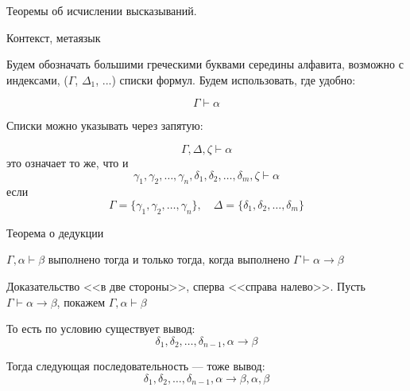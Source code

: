 \documentclass[aspectratio=169]{beamer}
\begin{document}
\newtheorem{axiom}{Аксиома}
\newtheorem{exmprus}{Пример}
\newtheorem{defrus}{Определение}
\newtheorem{lemmarus}{Лемма}
\newtheorem{thmrus}{Теорема}

\begin{frame}{}
\begin{center}\Large Теоремы об исчислении высказываний.\end{center}
\end{frame}

\begin{frame}{Контекст, метаязык}

Будем обозначать большими греческими буквами середины
алфавита, возможно с индексами, ($\Gamma$, $\Delta_1$, ...) списки формул.
Будем использовать, где удобно:

$$\Gamma \vdash \alpha$$\pause

Списки можно указывать через запятую:

$$\Gamma, \Delta, \zeta \vdash \alpha$$\pause
это означает то же, что и 
$$\gamma_1,\gamma_2,\dots,\gamma_n,\delta_1,\delta_2,\dots,\delta_m,\zeta\vdash\alpha$$
если 
$$\Gamma = \{\gamma_1,\gamma_2,\dots,\gamma_n\},\quad \Delta = \{\delta_1,\delta_2,\dots,\delta_m\}$$

\end{frame}

\begin{frame}{Теорема о дедукции}

\begin{theorem}
$\Gamma,\alpha\vdash\beta$ выполнено тогда и только тогда, когда выполнено $\Gamma\vdash\alpha\rightarrow\beta$
\end{theorem}\pause

\vspace{0.5cm}
Доказательство <<в две стороны>>, сперва <<справа налево>>.
Пусть $\Gamma\vdash\alpha\rightarrow\beta$, покажем $\Gamma,\alpha\vdash\beta$\pause\vspace{0.5cm}

То есть по условию существует вывод: $$\delta_1, \delta_2, \dots, \delta_{n-1}, \alpha\rightarrow\beta$$\pause

Тогда следующая последовательность --- тоже вывод: 
$$\delta_1, \delta_2, \dots, \delta_{n-1}, \alpha\rightarrow\beta, \alpha, \beta$$


\end{frame}
\end{document}
